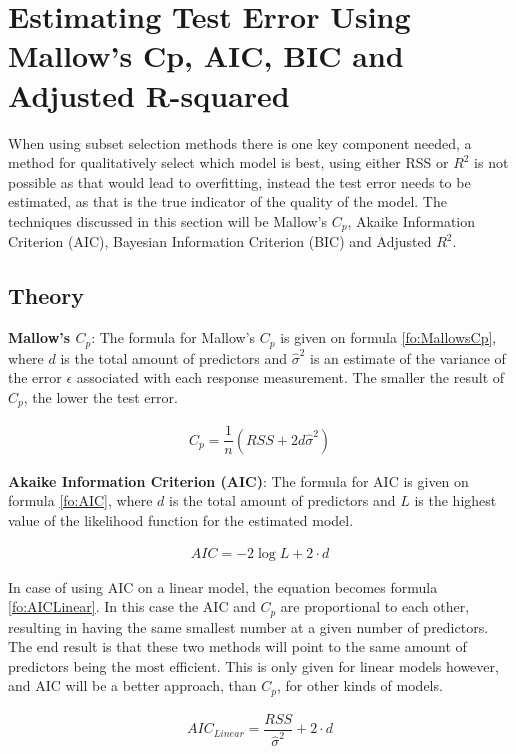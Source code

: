 \section{Estimating Test Error Using Mallow's Cp, AIC, BIC and Adjusted R-squared}\label{sc:estimatingTestError}
When using subset selection methods there is one key component needed, a method for qualitatively select which model is best, using either RSS or $R^2$ is not possible as that would lead to overfitting, instead the test error needs to be estimated, as that is the true indicator of the quality of the model. The techniques discussed in this section will be Mallow's $C_p$, Akaike Information Criterion (AIC), Bayesian Information Criterion (BIC) and Adjusted $R^2$.

\subsection{Theory}
\textbf{Mallow's $C_p$}: The formula for Mallow's $C_p$ is given on formula \ref{fo:MallowsCp}, where $d$ is the total amount of predictors and $\hat{\sigma}^2$ is an estimate of the variance of the error $\epsilon$ associated with each response measurement. The smaller the result of $C_p$, the lower the test error. 

\begin{align}\label{fo:MallowsCp}
	C_p = \dfrac{1}{n} (RSS + 2 d \hat{\sigma}^2)
\end{align}

\textbf{Akaike Information Criterion (AIC)}: The formula for AIC is given on formula \ref{fo:AIC}, where $d$ is the total amount of predictors and $L$ is the highest value of the likelihood function for the estimated model.

\begin{align}\label{fo:AIC}
	AIC = -2 \log L + 2 \cdot d
\end{align}

In case of using AIC on a linear model, the equation becomes formula \ref{fo:AICLinear}. In this case the AIC and $C_p$ are proportional to each other, resulting in having the same smallest number at a given number of predictors. The end result is that these two methods will point to the same amount of predictors being the most efficient. This is only given for linear models however, and AIC will be a better approach, than $C_p$, for other kinds of models.
 
\begin{align}\label{fo:AICLinear}
	AIC_{Linear} = \dfrac{RSS}{\hat{\sigma}^2} + 2 \cdot d
\end{align}

